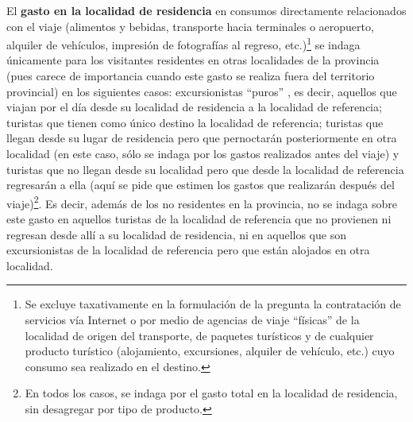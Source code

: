 \documentclass[
]{book}
\begin{document}
El \textbf{gasto en la localidad de residencia} en consumos directamente relacionados con el viaje (alimentos y bebidas, transporte hacia terminales o aeropuerto, alquiler de vehículos, impresión de fotografías al regreso, etc.)\footnote{Se excluye taxativamente en la formulación de la pregunta la contratación de servicios vía Internet o por medio de agencias de viaje ``físicas'' de la localidad de origen del transporte, de paquetes turísticos y de cualquier producto turístico (alojamiento, excursiones, alquiler de vehículo, etc.) cuyo consumo sea realizado en el destino.} se indaga únicamente para los visitantes residentes en otras localidades de la provincia (pues carece de importancia cuando este gasto se realiza fuera del territorio provincial) en los siguientes casos: excursionistas ``puros'' , es decir, aquellos que viajan por el día desde su localidad de residencia a la localidad de referencia; turistas que tienen como único destino la localidad de referencia; turistas que llegan desde su lugar de residencia pero que pernoctarán posteriormente en otra localidad (en este caso, sólo se indaga por los gastos realizados antes del viaje) y turistas que no llegan desde su localidad pero que desde la localidad de referencia regresarán a ella (aquí se pide que estimen los gastos que realizarán después del viaje)\footnote{En todos los casos, se indaga por el gasto total en la localidad de residencia, sin desagregar por tipo de producto.}. Es decir, además de los no residentes en la provincia, no se indaga sobre este gasto en aquellos turistas de la localidad de referencia que no provienen ni regresan desde allí a su localidad de residencia, ni en aquellos que son excursionistas de la localidad de referencia pero que están alojados en otra localidad.
\end{document}
